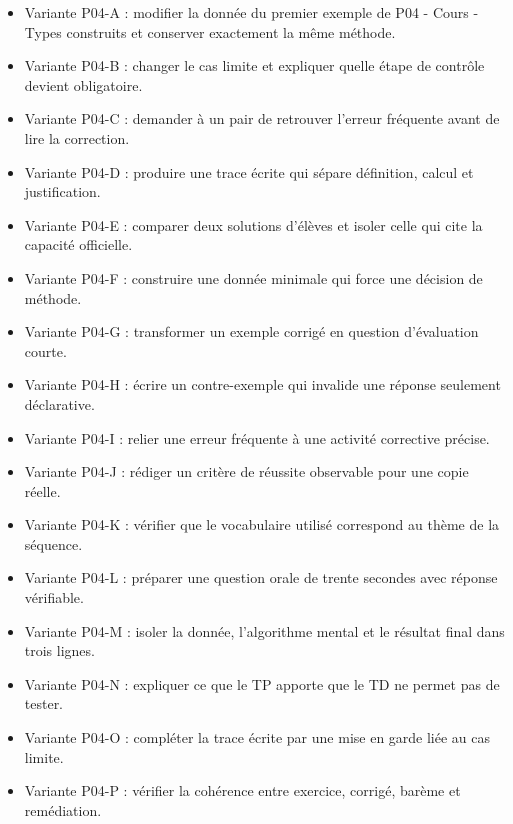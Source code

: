 \begin{itemize}
\tightlist
\item
  Variante P04-A : modifier la donnée du premier exemple de P04 - Cours
  - Types construits et conserver exactement la même méthode.
\item
  Variante P04-B : changer le cas limite et expliquer quelle étape de
  contrôle devient obligatoire.
\item
  Variante P04-C : demander à un pair de retrouver l'erreur fréquente
  avant de lire la correction.
\item
  Variante P04-D : produire une trace écrite qui sépare définition,
  calcul et justification.
\item
  Variante P04-E : comparer deux solutions d'élèves et isoler celle qui
  cite la capacité officielle.
\item
  Variante P04-F : construire une donnée minimale qui force une décision
  de méthode.
\item
  Variante P04-G : transformer un exemple corrigé en question
  d'évaluation courte.
\item
  Variante P04-H : écrire un contre-exemple qui invalide une réponse
  seulement déclarative.
\item
  Variante P04-I : relier une erreur fréquente à une activité corrective
  précise.
\item
  Variante P04-J : rédiger un critère de réussite observable pour une
  copie réelle.
\item
  Variante P04-K : vérifier que le vocabulaire utilisé correspond au
  thème de la séquence.
\item
  Variante P04-L : préparer une question orale de trente secondes avec
  réponse vérifiable.
\item
  Variante P04-M : isoler la donnée, l'algorithme mental et le résultat
  final dans trois lignes.
\item
  Variante P04-N : expliquer ce que le TP apporte que le TD ne permet
  pas de tester.
\item
  Variante P04-O : compléter la trace écrite par une mise en garde liée
  au cas limite.
\item
  Variante P04-P : vérifier la cohérence entre exercice, corrigé, barème
  et remédiation.
\end{itemize}
